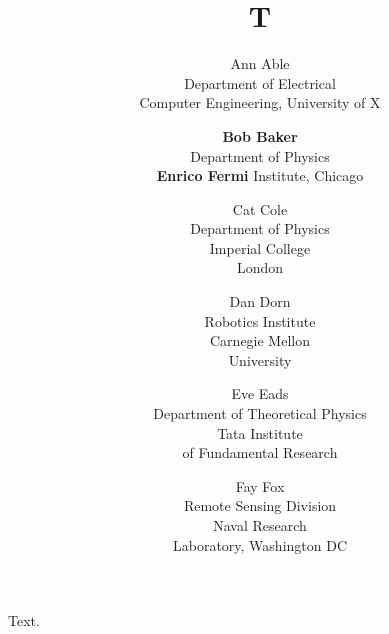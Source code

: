 \documentclass{article}
\title{T}
\author{Ann Able \\
Department of Electrical \\
Computer Engineering, University of X
\and {\bf Bob Baker} \\
Department of Physics \\
{\bf Enrico Fermi} Institute, Chicago
\and Cat Cole \\
Department of Physics \\
Imperial College \\
London
\and Dan Dorn \\
Robotics Institute \\
Carnegie Mellon \\
University
\and Eve Eads \\
Department of Theoretical Physics \\
Tata Institute \\
of Fundamental Research
\and Fay Fox \\
Remote Sensing Division \\
Naval Research \\
Laboratory, Washington DC}
\begin{document}
\maketitle
Text.
\end{document}

